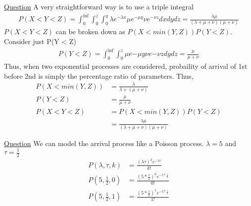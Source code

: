 \documentclass[11pt, a4paper]{article}
\begin{document}
\begin{enumerate}
        \hypertarget{a_threevar}{\item} \hyperlink{q_threevar}{Question}\newline
        A very straightforward way is to use a triple integral
        \begin{align*}
            P(X < Y < Z) = \int_{0}^{\inf} \int_{0}^{z} \int_{0}^{y} \lambda e^{-\lambda x} \mu e^{-\mu y} \nu e^{-\nu z} dx dy dz = \frac{\lambda \mu}{(\lambda + \mu + \nu)(\mu + \nu)}
        \end{align*}
        $P(X < Y < Z)$ can be broken down as $P(X < min(Y,Z)) P(Y < Z)$. Consider just P(Y < Z)
        \begin{align*}
            P(Y < Z) = \int_{0}^{\inf} \int_{0}^{z} \mu e{-\mu y} \nu e{-\nu z} dy dz = \frac{\mu}{\mu + \nu}
        \end{align*}
        Thus, when two exponential processes are considered, probaility of arrival of 1st before 2nd is simply the percentage ratio of parameters. Thus,
        \begin{align*}
            P(X < min(Y,Z)) &= \frac{\lambda}{\lambda + (\mu + \nu)} \tag*{$Y$ and $Z$ can be combined as a single process}\\
            P(Y < Z) &= \frac{\mu}{\mu + \nu}\\
            P(X < Y < Z) &= P(X < min(Y,Z)) P(Y < Z)\\
                        &= \frac{\lambda \mu}{(\lambda + \mu + \nu)(\mu + \nu)}
        \end{align*}


        \hypertarget{a_poissonemails}{\item} \hyperlink{q_poissonemails}{Question}
        We can model the arrival process like a Poisson process. $\lambda = 5$ and $\tau = \frac{1}{2}$
        \begin{align*}
                P(\lambda, \tau, k) &= \frac{(\lambda \tau)^{k} e^{-\lambda \tau}}{k!} \\
                P(5, \frac{1}{2}, 0) &= \frac{(5 * \frac{1}{2})^{0} e^{-5 * \frac{1}{2}}}{0!} \\
                P(5, \frac{1}{2}, 1) &= \frac{(5 * \frac{1}{2})^{1} e^{-5 * \frac{1}{2}}}{1!}
        \end{align*}


\end{enumerate}
\end{document}
